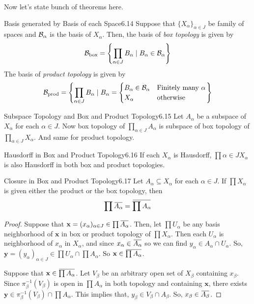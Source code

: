 \documentclass[12pt, a4paper, twoside]{article}
\newcommand{\overbar}[1]{\mkern 1.5mu\overline{\mkern-1.5mu#1\mkern-1.5mu}\mkern 1.5mu}
\theoremstyle{plain}
\begin{document}
Now let's state bunch of theorems here. 

\begin{thm}{Basis generated by Basis of each Space}{6.14}
    Suppose that $\{X_\alpha\}_{\alpha \in J}$ be family of spaces and ${\mathcal {B}}_\alpha$ is the basis of $X_\alpha$. 
    Then, the basis of \textit{box topology} is given by 
    \[{\mathcal {B}}_{\text{box}} = \left\{\prod_{\alpha \in J}B_\alpha \mid B_\alpha \in {\mathcal {B}}_\alpha\right\}\]
    The basis of \textit{product topology} is given by 
    \[{\mathcal {B}}_{\text{prod}} = \left\{\prod_{\alpha \in J} B_\alpha \mid B_\alpha = \begin{cases}
    B_\alpha \in {\mathcal {B}}_\alpha & \text{Finitely many $\alpha$} \\
    X_\alpha & \text{otherwise}
    \end{cases}\right\}\]
\end{thm}

\begin{thm}{Subspace Topology and Box and Product Topology}{6.15}
    Let $A_\alpha$ be a subspace of $X_\alpha$ for each $\alpha \in J$. 
    Now box topology of $\prod_{\alpha \in J} A_\alpha$ is subspace of box topology of $\prod_{\alpha \in J} X_\alpha$. 
    And same for product topology. 
\end{thm}

\begin{thm}{Hausdorff in Box and Product Topology}{6.16}
    If each $X_\alpha$ is Hausdorff, $\prod{\alpha \in J} X_\alpha$ is also Hausdorff in both box and product topologies. 
\end{thm}

\begin{thm}{Closure in Box and Product Topology}{6.17}
    Let $A_\alpha \subseteq X_\alpha$ for each $\alpha \in J$. If $\prod X_\alpha$ is given either the product or the box topology, then 
    \[\prod \overbar{A_\alpha} = \overbar{\prod A_\alpha}\]
\end{thm}

\begin{proof}

Suppose that $\mathbf{x} = (x_\alpha)_{\alpha \in J} \in \prod \overbar{A_\alpha}$. 
Then, let $\prod U_\alpha$ be any basis neighborhood of $\mathbf{x}$ in box or product topology of $\prod X_\alpha$. 
Then each $U_\alpha$ is neighborhood of $x_\alpha$ in $X_\alpha$, and since $x_\alpha \in \overbar{A_\alpha}$ so we can find 
$y_\alpha \in A_\alpha \cap U_\alpha$. So, $\mathbf{y} = (y_\alpha)_{\alpha \in J} \in \prod U_\alpha \cap \prod A_\alpha$. So $\mathbf{x} \in \overbar{\prod{A_\alpha}}$. 

Suppose that $\mathbf{x} \in \overbar{\prod A_\alpha}$. 
Let $V_\beta$ be an arbitrary open set of $X_\beta$ containing $x_\beta$. Since $\pi^{-1}_\beta(V_\beta)$ is open in $\prod A_\alpha$ in both topology and containing $\mathbf{x}$, 
there exists $\mathbf{y} \in \pi_\beta^{-1}(V_\beta) \cap \prod A_\alpha$. 
This implies that, $y_\beta \in V_\beta \cap A_\beta$. So, $x_\beta \in \overbar{A_\beta}$. 
\end{proof}
\end{document}
